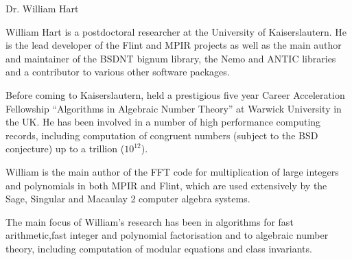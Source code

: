 \begin{participant}{Dr. William Hart}

William Hart is a postdoctoral researcher at the University of
Kaiserslautern. He is the lead developer of the Flint and MPIR projects
as well as the main author and maintainer of the BSDNT bignum library, the
Nemo and ANTIC libraries and a contributor to various other software packages.

Before coming to Kaiserslautern, held a prestigious five year Career
Acceleration Fellowship ``Algorithms in Algebraic Number Theory'' at Warwick 
University in the UK. He has been involved in a number of high performance
computing records, including computation of congruent numbers (subject to the 
BSD conjecture) up to a trillion ($10^{12}$).

William is the main author of the FFT code for multiplication of large integers
and polynomials in both MPIR and Flint, which are used extensively by the Sage,
Singular and Macaulay 2 computer algebra systems.

The main focus of William's research has been in algorithms for fast arithmetic,fast integer and polynomial factorisation and to algebraic number theory,
including computation of modular equations and class invariants.
\end{participant}

